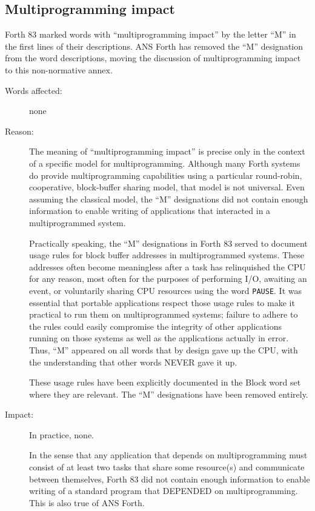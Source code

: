 \subsection{Multiprogramming impact} %
\label{diff:multitasking}

Forth 83 marked words with ``multiprogramming impact'' by the letter
``M'' in the first lines of their descriptions. ANS Forth has removed
the ``M'' designation from the word descriptions, moving the dis\-cus\-sion
of multiprogramming impact to this non-normative annex.

\begin{description}
\item[Words affected:]
	none

\item[Reason:]
	The meaning of ``multiprogramming impact'' is precise only in the
	context of a specific model for multiprogramming. Although many
	Forth systems do provide multiprogramming capabilities using a
	particular round-robin, cooperative, block-buffer sharing model,
	that model is not universal. Even assuming the classical model,
	the ``M'' designations did not contain enough information to
	enable writing of applications that interacted in a multiprogrammed
	system.

	Practically speaking, the ``M'' designations in Forth 83 served
	to document usage rules for block buffer addresses in multiprogrammed
	systems. These addresses often become meaningless after a task
	has relinquished the CPU for any reason, most often for the
	purposes of performing I/O, awaiting an event, or voluntarily
	sharing CPU resources using the word \texttt{PAUSE}. It was
	essential that portable applications respect those usage rules to
	make it practical to run them on multiprogrammed systems; failure
	to adhere to the rules could easily compromise the integrity of
	other applications running on those systems as well as the
	applications actually in error. Thus, ``M'' appeared on all words
	that by design gave up the CPU, with the understanding that other
	words NEVER gave it up.

	These usage rules have been explicitly documented in the Block
	word set where they are relevant. The ``M'' designations have
	been removed entirely.

\item[Impact:]
	In practice, none.

	In the sense that any application that depends on multiprogramming
	must consist of at least two tasks that share some resource(s) and
	communicate between themselves, Forth 83 did not contain enough
	information to enable writing of a standard program that DEPENDED
	on multiprogramming. This is also true of ANS Forth.


\end{description}
